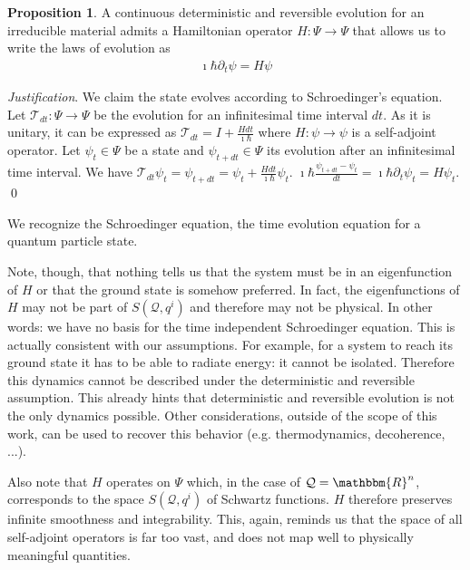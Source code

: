 \documentclass[aps,pra,10pt,twocolumn,floatfix,nofootinbib]{revtex4-1}
\numberwithin{equation}{section}
\theoremstyle{definition}
\newtheorem{prop}[equation]{Proposition}
\newenvironment{justification}{\emph{Justification}.}{\qed}
\begin{document}
	
\begin{prop}\label{prop:schroedinger_equation}
	A continuous deterministic and reversible evolution for an irreducible material admits a Hamiltonian operator $H : \Psi \rightarrow \Psi$ that allows us to write the laws of evolution as
	\begin{align*}
	\imath \hbar \partial_t \psi = H \psi
	\end{align*}
\end{prop}

\begin{justification}
	We claim the state evolves according to Schroedinger's equation. Let  $\mathcal{T}_{dt}: \Psi \rightarrow \Psi$ be the evolution for an infinitesimal time interval $dt$. As it is unitary, it can be expressed as $\mathcal{T}_{dt} = I + \frac{H dt}{\imath \hbar}$ where $H : \psi \rightarrow \psi$ is a self-adjoint operator. Let $\psi_t \in \Psi$ be a state and $\psi_{t+dt} \in \Psi$ its evolution after an infinitesimal time interval. We have $\mathcal{T}_{dt} \psi_t = \psi_{t+dt} = \psi_t + \frac{H dt}{\imath \hbar} \psi_t$. $\imath \hbar \frac{\psi_{t+dt} - \psi_t}{dt} = \imath \hbar \partial_t \psi_t = H\psi_t$.
\end{justification}

We recognize the Schroedinger equation, the time evolution equation for a quantum particle state.

Note, though, that nothing tells us that the system must be in an eigenfunction of $H$ or that the ground state is somehow preferred. In fact, the eigenfunctions of $H$ may not be part of $S(\mathcal{Q}, q^i)$ and therefore may not be physical. In other words: we have no basis for the time independent Schroedinger equation. This is actually consistent with our assumptions. For example, for a system to reach its ground state it has to be able to radiate energy: it cannot be isolated. Therefore this dynamics cannot be described under the deterministic and reversible assumption. This already hints that deterministic and reversible evolution is not the only dynamics possible. Other considerations, outside of the scope of this work, can be used to recover this behavior (e.g. thermodynamics, decoherence, ...).

Also note that $H$ operates on $\Psi$ which, in the case of $\mathcal{Q}=\mathbbm{R}^n$, corresponds to the space $S(\mathcal{Q}, q^i)$ of Schwartz functions. $H$ therefore preserves infinite smoothness and integrability. This, again, reminds us that the space of all self-adjoint operators is far too vast, and does not map well to physically meaningful quantities.
\end{document}
